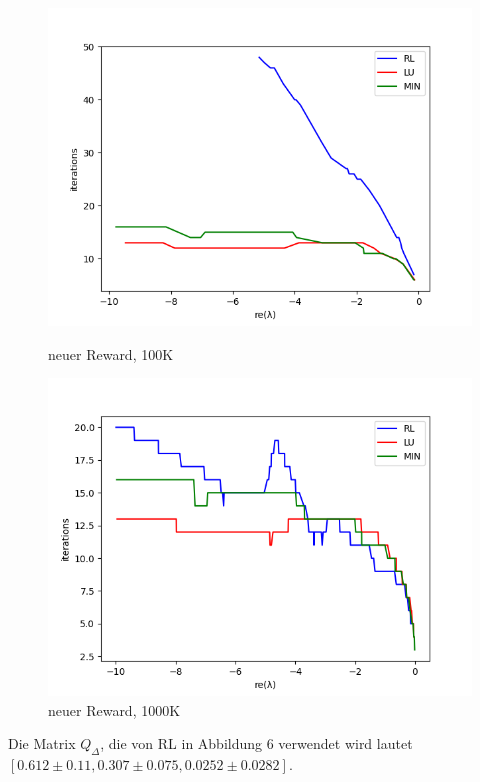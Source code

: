 \documentclass[]{article}
\begin{document}
\begin{figure}[h]
\begin{minipage}[b]{.6\linewidth}
	\includegraphics[width=\linewidth]{new.png}
	\caption{neuer Reward, 100K}
\end{minipage}
\begin{minipage}[b]{.6\linewidth} %
	\includegraphics[width=\linewidth]{supertollnew.png}
	\caption{neuer Reward, 1000K}
\end{minipage}
\end{figure}

Die Matrix $Q_\Delta$, die von RL in Abbildung 6 verwendet wird lautet \\
$[0.612\pm 0.11,  0.307\pm 0.075, 0.0252 \pm 0.0282]$. 
\end{document}
